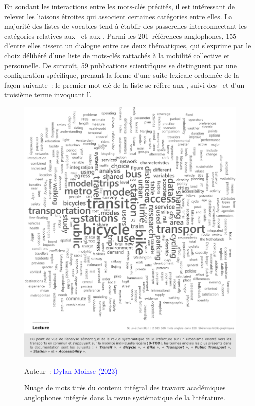 \begin{refsegment}
En sondant les interactions entre les mots-clés précités, il est intéressant de relever les liaisons étroites qui associent certaines catégories entre elles. La majorité des listes de vocables tend à établir des passerelles interconnectant les catégories relatives aux ~et aux . Parmi les 201~références anglophones, 155 d'entre elles tissent un dialogue entre ces deux thématiques, qui s'exprime par le choix délibéré d'une liste de mots-clés rattachés à la mobilité collective et personnelle. De surcroît, 59 publications scientifiques se distinguent par une configuration spécifique, prenant la forme d'une suite lexicale ordonnée de la façon suivante~: le premier mot-clé de la liste se réfère aux , suivi des ~et d'un troisième terme invoquant l'.%

    \begin{figure}[h!]\vspace*{4pt}
        \caption{Nuage de mots tirés du contenu intégral des travaux académiques anglophones intégrés dans la revue systématique de la littérature.}
        \label{fig-chap2:contenu-textuel-rsl}
        \centerline{\includegraphics[width=1\columnwidth]{src/Figures/Chap-2/FR_RSL_Mots_contenu.pdf}}
        \vspace{5pt}
        \begin{flushright}\scriptsize{
        Auteur~: \textcolor{blue}{Dylan Moinse (2023)}
        }\end{flushright}
    \end{figure}
    

\end{refsegment}
